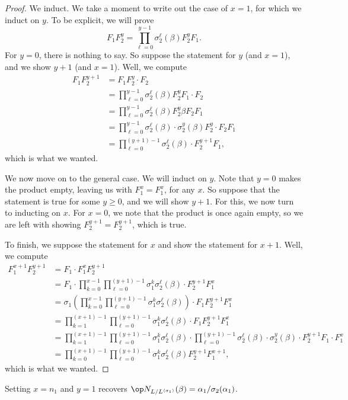 \documentclass{article}
\numberwithin{equation}{section}
\begin{document}
\begin{proof}
	We induct. We take a moment to write out the case of $x=1$, for which we induct on $y$. To be explicit, we will prove
	\[F_1F_2^y=\prod_{\ell=0}^{y-1}\sigma_2^\ell(\beta)F_2^yF_1.\]
	For $y=0$, there is nothing to say. So suppose the statement for $y$ (and $x=1$), and we show $y+1$ (and $x=1$). Well, we compute
	\begin{align*}
		F_1F_2^{y+1} &= F_1F_2^y\cdot F_2 \\
		&= \prod_{\ell=0}^{y-1}\sigma_2^\ell(\beta)F_2^yF_1\cdot F_2 \\
		&= \prod_{\ell=0}^{y-1}\sigma_2^\ell(\beta)F_2^y\beta F_2F_1 \\
		&= \prod_{\ell=0}^{y-1}\sigma_2^\ell(\beta)\cdot \sigma_2^y(\beta)F_2^y\cdot F_2F_1 \\
		&= \prod_{\ell=0}^{(y+1)-1}\sigma_2^\ell(\beta)\cdot F_2^{y+1}F_1,
	\end{align*}
	which is what we wanted.
	
	We now move on to the general case. We will induct on $y$. Note that $y=0$ makes the product empty, leaving us with $F_1^x=F_1^x$, for any $x$. So suppose that the statement is true for some $y\ge0$, and we will show $y+1$. For this, we now turn to inducting on $x$. For $x=0$, we note that the product is once again empty, so we are left with showing $F_2^{y+1}=F_2^{y+1}$, which is true.
	
	To finish, we suppose the statement for $x$ and show the statement for $x+1$. Well, we compute
	\begin{align*}
		F_1^{x+1}F_2^{y+1} &= F_1\cdot F_1^xF_2^{y+1} \\
		&= F_1\cdot \prod_{k=0}^{x-1}\prod_{\ell=0}^{(y+1)-1}\sigma_1^k\sigma_2^\ell(\beta)\cdot F_2^{y+1}F_1^x \\
		&= \sigma_1\left(\prod_{k=0}^{x-1}\prod_{\ell=0}^{(y+1)-1}\sigma_1^k\sigma_2^\ell(\beta)\right)\cdot F_1F_2^{y+1}F_1^x \\
		&= \prod_{k=1}^{(x+1)-1}\prod_{\ell=0}^{(y+1)-1}\sigma_1^k\sigma_2^\ell(\beta)\cdot F_1F_2^{y+1}F_1^x \\
		&= \prod_{k=1}^{(x+1)-1}\prod_{\ell=0}^{(y+1)-1}\sigma_1^k\sigma_2^\ell(\beta)\cdot \prod_{\ell=0}^{(y+1)-1}\sigma_2^\ell(\beta)\cdot \sigma_2^y(\beta)\cdot F_2^{y+1}F_1\cdot F_1^x \\
		&= \prod_{k=0}^{(x+1)-1}\prod_{\ell=0}^{(y+1)-1}\sigma_1^k\sigma_2^\ell(\beta)F_2^{y+1}F_1^{x+1},
	\end{align*}
	which is what we wanted.
\end{proof}
\begin{remark}
	Setting $x=n_1$ and $y=1$ recovers $\op N_{L/L^{\langle\sigma_1\rangle}}(\beta)=\alpha_1/\sigma_2(\alpha_1)$.
\end{remark}
\end{document}

